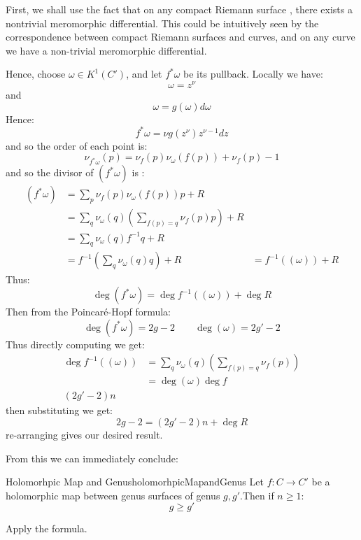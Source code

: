 \documentclass{book}
\begin{document}
\begin{Proof}
  First, we shall use the fact that on any compact Riemann surface , there exists a nontrivial meromorphic
  differential. This could be intuitively seen by the correspondence between compact Riemann surfaces and
  curves, and on any curve we have a non-trivial meromorphic differential.

  Hence, choose $\omega \in K^1(C')$, and let $f^*\omega$ be its pullback. Locally we have:
  \[
    \omega = z^\nu
  \]
  and
  \[
    \omega = g(\omega)d\omega
  \]
  Hence:
  \[
    f^*\omega = \nu g(z^\nu)z^{\nu-1}dz
  \]
  and so the order of each point is:
  \[
    \nu_{f^*\omega}(p) = \nu_f(p)\nu_\omega(f(p)) + \nu_f(p)-1
  \]
  and so the divisor of $(f^*\omega)$ is :
  \begin{align*}
    (f^*\omega) &= \sum_p \nu_f(p)\nu_\omega(f(p))p + R\\
                &= \sum_q \nu_\omega(q) \left(\sum_{f(p) = q} \nu_f(p)p\right) + R\\
                &= \sum_q \nu_\omega(q)f^{-1}q+R\\
                &= f^{-1} \left(\sum_q \nu_\omega(q)q\right) + R
                &= f^{-1}\left((\omega)\right) + R
  \end{align*}
  Thus:
  \[
    \deg(f^*\omega) = \deg f^{-1}( (\omega)) + \deg R
  \]
  Then from the Poincar\'e-Hopf formula:
  \[
    \deg(f^*\omega) = 2g -2 \qquad \deg (\omega) = 2g' - 2
  \]
  Thus directly computing we get:
  \begin{align*}
    \deg f^{-1} ( (\omega)) &= \sum_q \nu_\omega(q) \left(\sum_{f(p) = q} \nu_f(p)\right)\\
    &= \deg(\omega)\deg f\\
    (2g'-2)n
  \end{align*}
  then substituting we get:
  \[
    2g -2 = (2g'-2)n + \deg R
  \]
  re-arranging gives our desired result.
\end{Proof}

From this we can immediately conclude:

\begin{cor}{Holomorhpic Map and Genus}{holomorhpicMapandGenus}
  Let $f: C \to C'$ be a holomorphic map between genus surfaces of genus $g,g'$.Then if $n\ge 1$:
  \[
    g \ge g'
  \]
\end{cor}

\begin{Proof}
  Apply the formula.
\end{Proof}
\end{document}
